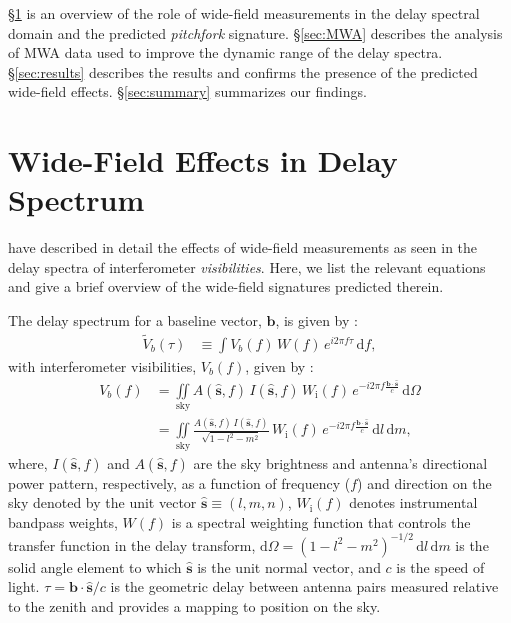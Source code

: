 \documentclass[preprint2,apjl,numberedappendix,twocolappendix,appendixfloats]{emulateapj}
\newcommand{\dif}{\mathrm{d}}
\begin{document}
\S\ref{sec:wide-field} is an overview of the role of wide-field measurements in the delay spectral domain and the predicted {\it pitchfork} signature. \S\ref{sec:MWA} describes the analysis of MWA data used to improve the dynamic range of the delay spectra. \S\ref{sec:results} describes the results and confirms the presence of the predicted wide-field effects. \S\ref{sec:summary} summarizes our findings.

\section{Wide-Field Effects in Delay Spectrum}\label{sec:wide-field}

\citet{thy15} have described in detail the effects of wide-field measurements as seen in the delay spectra of interferometer {\it visibilities}. Here, we list the relevant equations and give a brief overview of the wide-field signatures predicted therein. 

The delay spectrum for a baseline vector, $\boldsymbol{b}$, is given by \citep{par12a,par12b,thy13,thy15}: 
\begin{align}
  \tilde{V}_b(\tau) &\equiv \int V_b(f)\,W(f)\,e^{i2\pi f\tau}\,\dif f,
\end{align}
with interferometer visibilities, $V_b(f)$, given by \citep{van34,zer38,tho01}:
\begin{align} 
  V_b(f) &= \iint\limits_\textrm{sky} A(\hat{\boldsymbol{s}},f)\,I(\hat{\boldsymbol{s}},f)\,W_\textrm{i}(f)\,e^{-i2\pi f\frac{\boldsymbol{b}\cdot\hat{\boldsymbol{s}}}{c}}\,\dif\Omega \\
         &= \iint\limits_\textrm{sky} \frac{A(\hat{\boldsymbol{s}},f)\,I(\hat{\boldsymbol{s}},f)}{\sqrt{1-l^2-m^2}}\,W_\textrm{i}(f)\,e^{-i2\pi f\frac{\boldsymbol{b}\cdot\hat{\boldsymbol{s}}}{c}}\,\dif l\,\dif m, 
\end{align}
where, $I(\hat{\boldsymbol{s}},f)$ and $A(\hat{\boldsymbol{s}},f)$ are the sky brightness and antenna's directional power pattern, respectively, as a function of frequency ($f$) and direction on the sky denoted by the unit vector $\hat{\boldsymbol{s}}\equiv (l,m,n)$, $W_\textrm{i}(f)$ denotes instrumental bandpass weights, $W(f)$ is a spectral weighting function that controls the transfer function in the delay transform, $\dif\Omega=(1-l^2-m^2)^{-1/2}\,\dif l\,\dif m$ is the solid angle element to which $\hat{\boldsymbol{s}}$ is the unit normal vector, and $c$ is the speed of light. $\tau=\boldsymbol{b}\cdot\hat{\boldsymbol{s}}/c$ is the geometric delay between antenna pairs measured relative to the zenith and provides a mapping to position on the sky.
\end{document}
